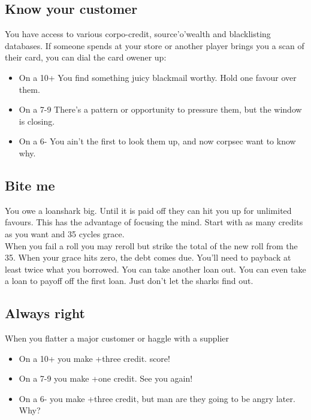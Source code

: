 \documentclass{tufte-book}
\begin{document}
\subsection{Know your customer}
You have access to various corpo-credit, source'o'wealth and blacklisting databases. If someone spends at your store or another player brings you a scan of their card, you can dial the card owener up: 
\begin{itemize}
\item On a 10+ You find something juicy blackmail worthy. Hold one favour over them.
\item On a  7-9 There's a pattern or opportunity to pressure them, but the window is closing.
\item On a 6- You ain't the first to look them up, and now corpsec want to know why.
\end{itemize}

\subsection{Bite me}
You owe a loanshark big. Until it is paid off they can hit you up for unlimited favours. This has the advantage of focusing the mind. Start with as many credits as you want and 35 cycles grace. \\ When you fail a roll you may reroll but strike the total of the new roll from the 35. When your grace hits zero, the debt comes due. You'll need to payback at least twice what you borrowed. You can take another loan out. You can even take a loan to payoff off the first loan. Just don't let the sharks find out.

\subsection{Always right}
When you flatter a major customer or haggle with a supplier 
\begin{itemize}
\item On a 10+ you make +three credit. score!
\item On a 7-9 you make +one credit. See you again!
\item On a 6- you make +three credit, but man are they going to be angry later. Why?
\end{itemize}
\end{document}
